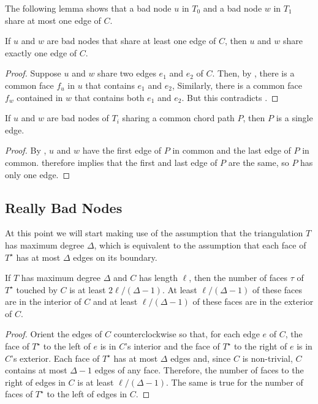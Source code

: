 \documentclass{patmorin}
\newcommand{\dual}[1]{{#1}^\star}
\begin{document}
The following lemma shows that a bad node $u$ in $T_0$ and a bad node $w$
in $T_1$ share at most one edge of $C$.

\begin{lem}
   If $u$ and $w$ are bad nodes that share at least one edge of $C$, then
   $u$ and $w$ share exactly one edge of $C$.
\end{lem}

\begin{proof}
   Suppose $u$ and $w$ share two edges $e_1$ and $e_2$ of $C$.  Then,
   by , there is a common face $f_u$ in $u$ that
   contains $e_1$ and $e_2$, Similarly, there is a common face $f_w$
   contained in $w$ that contains both $e_1$ and $e_2$.  But this
   contradicts .
\end{proof}


\begin{lem}
   If $u$ and $w$ are bad nodes of $T_i$ sharing a common chord path $P$,
   then $P$ is a single edge.
\end{lem}

\begin{proof}
   By , $u$ and $w$ have the first edge of $P$ in
   common and the last edge of $P$ in common.  
   therefore implies that the first and last edge of $P$ are the same,
   so $P$ has only one edge.
\end{proof}

\subsection{Really Bad Nodes}


At this point we will start making use of the assumption that the
triangulation $T$ has maximum degree $\Delta$, which is equivalent to
the assumption that each face of $\dual{T}$ has at most $\Delta$ edges
on its boundary.

\begin{obs}
  If $T$ has maximum degree $\Delta$ and $C$ has length $\ell$, then
  the number of faces $\tau$ of $\dual{T}$ touched by $C$ is at least 
  $2\ell/(\Delta-1)$.  At least $\ell/(\Delta-1)$ of these faces are in
  the interior of $C$ and at least $\ell/(\Delta-1)$ of these faces are
  in the exterior of $C$.
\end{obs}

\begin{proof}
  Orient the edges of $C$ counterclockwise so that, for each edge
  $e$ of $C$, the face of $\dual{T}$ to the left of $e$ is in $C$'s
  interior and the face of $\dual{T}$ to the right of $e$ is in $C$'s
  exterior.  Each face of $\dual{T}$ has at most $\Delta$ edges and,
  since $C$ is non-trivial, $C$ contains at most $\Delta-1$ edges of any
  face. Therefore, the number of faces to the right of edges in $C$ is
  at least $\ell/(\Delta-1)$. The same is true for the number of faces
  of $\dual{T}$ to the left of edges in $C$.
\end{proof}
\end{document}
